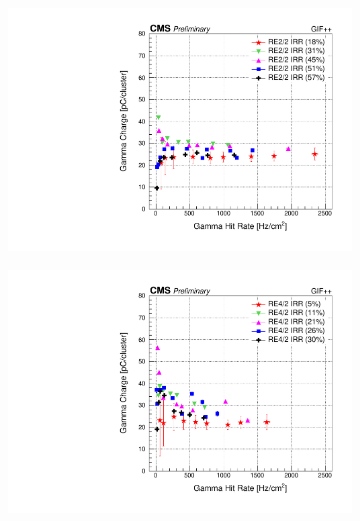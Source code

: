 	\begin{figure}[H]
    	\begin{subfigure}{0.5\linewidth}
			\centering
    		\includegraphics[width = \linewidth]{fig/chapt5/RE2-2_IRR_ClusterCharge_vs_Rate.pdf}
        	\caption{\label{fig:GIFpp_gcharge:A}}
    	\end{subfigure}
    	\begin{subfigure}{0.5\linewidth}
			\centering
    		\includegraphics[width = \linewidth]{fig/chapt5/RE4-2_IRR_ClusterCharge_vs_Rate.pdf}
        	\caption{\label{fig:GIFpp_gcharge:B}}
    	\end{subfigure}
    	\begin{subfigure}{0.5\linewidth}
			\centering

\end{subfigure}
\end{figure}
